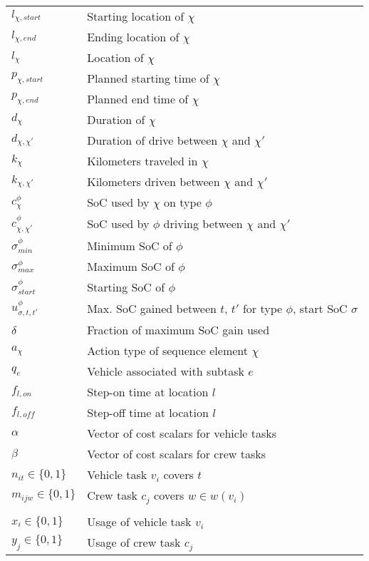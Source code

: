 \documentclass[]{article}
\begin{document}
\begin{table}
\begin{tabular}{ll}
    $l_{\chi,start}$ & Starting location of $\chi$ \\
    $l_{\chi,end}$ & Ending location of $\chi$ \\ 
    $l_{\chi} $ & Location of $\chi$ \\
    $p_{\chi,start}$ & Planned starting time of $\chi$ \\
    $p_{\chi,end}$ & Planned end time of $\chi$ \\
    $d_{\chi}$ & Duration of $\chi$ \\ 
    $d_{\chi,\chi'}$ & Duration of drive between $\chi$ and $\chi'$ \\
    $k_{\chi}$ & Kilometers traveled in $\chi$ \\
    $k_{\chi,\chi'}$ & Kilometers driven between $\chi$ and $\chi'$ \\
    $c^\phi_{\chi}$ & SoC used by $\chi$ on type $\phi$ \\
    $c^\phi_{\chi,\chi'}$ & SoC used by $\phi$ driving between $\chi$ and $\chi'$ \\
    $\sigma^\phi_{min}$ & Minimum SoC of $\phi$ \\ 
    $\sigma^\phi_{max}$ & Maximum SoC of $\phi$ \\ 
    $\sigma^\phi_{start}$ & Starting SoC of $\phi$ \\ 
    $u^\phi_{\sigma,t,t'}$ & Max. SoC gained between $t$, $t'$ for type $\phi$, start SoC $\sigma$ \\
    $\delta$ & Fraction of maximum SoC gain used \\
    $a_\chi$ & Action type of sequence element $\chi$ \\
    $q_e$ & Vehicle associated with subtask $e$ \\
    $f_{l,on}$ & Step-on time at location $l$\\
    $f_{l,\textit{off}}$ & Step-off time at location $l$ \\
    $\alpha$ & Vector of cost scalars for vehicle tasks \\
    $\beta$ & Vector of cost scalars for crew tasks \\
    $n_{it} \in \{ 0, 1 \}$ & Vehicle task $v_i$ covers $t$ \\ 
    $m_{ijw} \in \{ 0, 1 \}$ & Crew task $c_j$ covers $w \in w(v_i)$ \\
    \addlinespace[0.6em]
    \multicolumn{2}{l}{\textit{Decision variables}} \\
    $x_{i} \in \{ 0, 1 \}$ & Usage of vehicle task $v_i$  \\ 
    $y_{j} \in \{ 0, 1 \}$ & Usage of crew task $c_j$ \\ 

\end{tabular}
\end{table}
\end{document}
